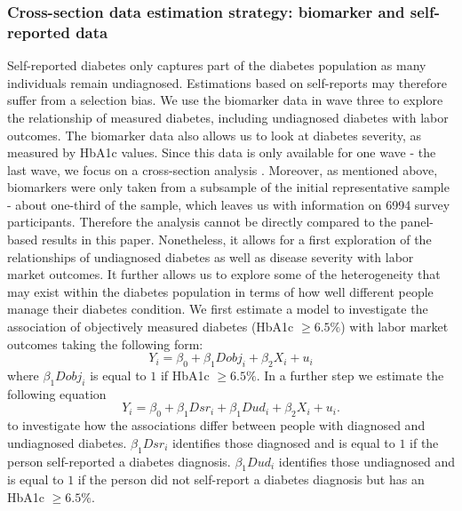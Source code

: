 \documentclass[12pt,english,british]{article}
\begin{document}
\subsubsection{Cross-section data estimation strategy: biomarker and self-reported data}

Self-reported diabetes only captures part of the diabetes population as many individuals remain undiagnosed.  Estimations based on self-reports may therefore suffer from a selection bias. We use the biomarker data in wave three to explore the relationship of measured diabetes, including undiagnosed diabetes with labor outcomes. The biomarker data also allows us to look at diabetes severity, as measured
by \ac{HbA1c} values. Since this data is only available for one wave - the
last wave, we focus on a cross-section analysis . Moreover,
as mentioned above, biomarkers were only taken from a subsample  of the initial representative sample - 
about one-third of the sample, which leaves
us with information on 6994 survey participants. Therefore the analysis
cannot be directly compared to the panel-based results in this paper.
Nonetheless, it allows for a first exploration of the relationships
of undiagnosed diabetes as well as disease severity with labor market
outcomes.  It further allows us to explore
some of the heterogeneity that may exist within the diabetes population
in terms of how well different people manage their diabetes condition.
We first estimate a model to investigate the association of objectively
measured diabetes (HbA1c $\geq6.5\%$) with labor market outcomes
taking the following form: 
\begin{equation}
Y_{i}=\beta_{0}+\beta_{1}Dobj_{i}+\beta_{2}X_{i}+u_{i}\label{eq:diab_objective}
\end{equation}
where $\beta_{1}Dobj_{i}$ is equal to $1$ if HbA1c $\geq6.5\%$.
In a further step we estimate the following equation 
\begin{equation}
Y_{i}=\beta_{0}+\beta_{1}Dsr_{i}+\beta_{1}Dud_{i}+\beta_{2}X_{i}+u_{i}.\label{eq:diab_sr_ud}
\end{equation}
to investigate how the associations differ between people with diagnosed
and undiagnosed diabetes. $\beta_{1}Dsr_{i}$ identifies those diagnosed
and is equal to $1$ if the person self-reported a diabetes diagnosis.
$\beta_{1}Dud_{i}$ identifies those undiagnosed and is equal to $1$
if the person did not self-report a diabetes diagnosis but has an
HbA1c $\geq6.5\%$.
\end{document}
